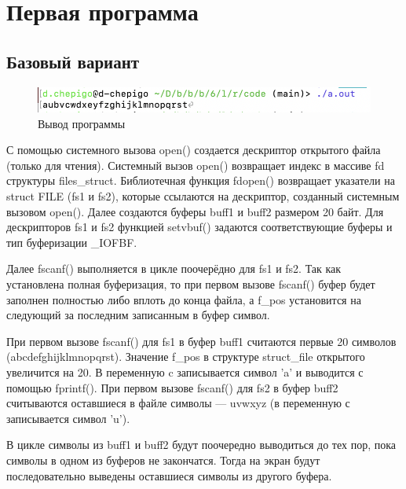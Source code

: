 \section{Первая программа}
\subsection{Базовый вариант}

\begin{figure}[!hbpt]
	\centering
	\includegraphics[width=\textwidth]{image/1-1}
	\caption{Вывод программы}
\end{figure}
\newpage
С помощью системного вызова open() создается дескриптор открытого файла (только для чтения). Системный вызов open() возвращает индекс в массиве fd структуры files\_struct.  Библиотечная функция fdopen() возвращает указатели на struct FILE (fs1 и fs2), которые ссылаются на дескриптор, созданный системным вызовом open(). Далее создаются буферы buff1 и buff2 размером 20 байт. Для дескрипторов fs1 и fs2 функцией setvbuf() задаются соответствующие буферы и тип буферизации \_IOFBF.

Далее fscanf() выполняется в цикле поочерёдно для fs1 и fs2. Так как установлена полная буферизация, то при первом вызове fscanf() буфер будет заполнен полностью либо вплоть до конца файла, а f\_pos установится на следующий за последним записанным в буфер символ.

При первом вызове fscanf() для fs1 в буфер buff1 считаются первые 20 символов (abcdefghijklmnopqrst). Значение f\_pos в структуре struct\_file открытого увеличится на 20. В переменную c записывается символ ’a’ и выводится с помощью fprintf(). При первом вызове fscanf() для fs2 в буфер buff2 считываются оставшиеся в файле символы --- uvwxyz (в переменную с записывается символ ’u’).

В цикле символы из buff1 и buff2 будут поочередно выводиться до тех пор, пока символы в одном из буферов не закончатся. Тогда на экран будут последовательно выведены оставшиеся символы из другого буфера.


